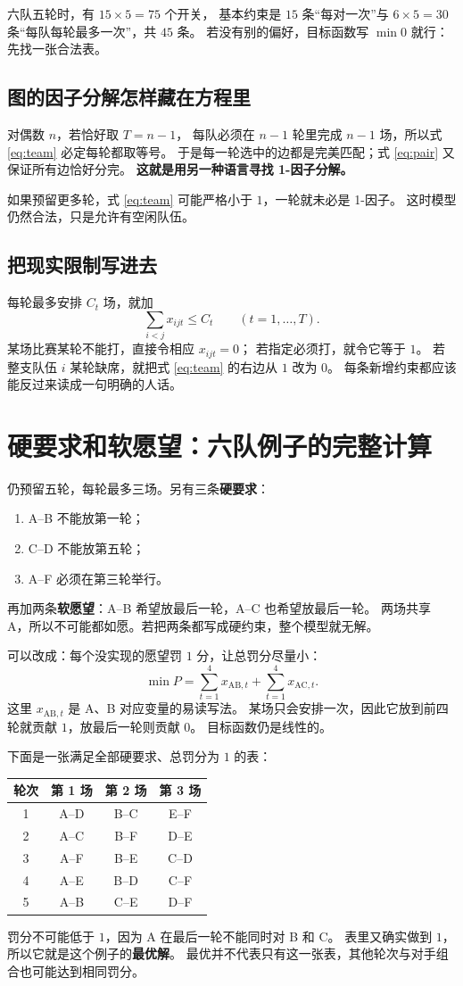 \documentclass[UTF8,11pt,fontset=none]{ctexart}
\begin{document}
六队五轮时，有 $15\times5=75$ 个开关，
基本约束是 $15$ 条“每对一次”与 $6\times5=30$ 条“每队每轮最多一次”，共 $45$ 条。
若没有别的偏好，目标函数写 $\min 0$ 就行：先找一张合法表。

\subsection{图的因子分解怎样藏在方程里}
对偶数 $n$，若恰好取 $T=n-1$，
每队必须在 $n-1$ 轮里完成 $n-1$ 场，所以式 \eqref{eq:team} 必定每轮都取等号。
于是每一轮选中的边都是完美匹配；式 \eqref{eq:pair} 又保证所有边恰好分完。
\textbf{这就是用另一种语言寻找 1-因子分解。}

如果预留更多轮，式 \eqref{eq:team} 可能严格小于 $1$，一轮就未必是 1-因子。
这时模型仍然合法，只是允许有空闲队伍。

\subsection{把现实限制写进去}
每轮最多安排 $C_t$ 场，就加
\[
\sum_{i<j}x_{ijt}\le C_t\qquad(t=1,\dots,T).
\]
某场比赛某轮不能打，直接令相应 $x_{ijt}=0$；
若指定必须打，就令它等于 $1$。
若整支队伍 $i$ 某轮缺席，就把式 \eqref{eq:team} 的右边从 $1$ 改为 $0$。
每条新增约束都应该能反过来读成一句明确的人话。

\section{硬要求和软愿望：六队例子的完整计算}
仍预留五轮，每轮最多三场。另有三条\textbf{硬要求}：
\begin{enumerate}
\item A--B 不能放第一轮；
\item C--D 不能放第五轮；
\item A--F 必须在第三轮举行。
\end{enumerate}
再加两条\textbf{软愿望}：A--B 希望放最后一轮，A--C 也希望放最后一轮。
两场共享 A，所以不可能都如愿。若把两条都写成硬约束，整个模型就无解。

可以改成：每个没实现的愿望罚 $1$ 分，让总罚分尽量小：
\[
\min P=\sum_{t=1}^4x_{\mathrm{AB},t}
       +\sum_{t=1}^4x_{\mathrm{AC},t}.
\]
这里 $x_{\mathrm{AB},t}$ 是 A、B 对应变量的易读写法。
某场只会安排一次，因此它放到前四轮就贡献 $1$，放最后一轮则贡献 $0$。
目标函数仍是线性的。

下面是一张满足全部硬要求、总罚分为 $1$ 的表：
\begin{center}
\begin{tabular}{cccc}
\toprule
轮次 & 第 1 场 & 第 2 场 & 第 3 场\\\midrule
1 & A--D & B--C & E--F\\
2 & A--C & B--F & D--E\\
3 & A--F & B--E & C--D\\
4 & A--E & B--D & C--F\\
5 & A--B & C--E & D--F\\
\bottomrule
\end{tabular}
\end{center}
罚分不可能低于 $1$，因为 A 在最后一轮不能同时对 B 和 C。
表里又确实做到 $1$，所以它就是这个例子的\textbf{最优解}。
最优并不代表只有这一张表，其他轮次与对手组合也可能达到相同罚分。
\end{document}
